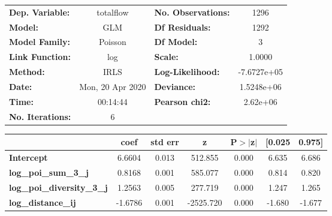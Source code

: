 \begin{center}
\begin{tabular}{lclc}
\toprule
\textbf{Dep. Variable:}            &    totalflow     & \textbf{  No. Observations:  } &      1296    \\
\textbf{Model:}                    &       GLM        & \textbf{  Df Residuals:      } &      1292    \\
\textbf{Model Family:}             &     Poisson      & \textbf{  Df Model:          } &         3    \\
\textbf{Link Function:}            &       log        & \textbf{  Scale:             } &     1.0000   \\
\textbf{Method:}                   &       IRLS       & \textbf{  Log-Likelihood:    } & -7.6727e+05  \\
\textbf{Date:}                     & Mon, 20 Apr 2020 & \textbf{  Deviance:          } &  1.5248e+06  \\
\textbf{Time:}                     &     00:14:44     & \textbf{  Pearson chi2:      } &   2.62e+06   \\
\textbf{No. Iterations:}           &        6         & \textbf{                     } &              \\
\bottomrule
\end{tabular}
\begin{tabular}{lcccccc}
                                   & \textbf{coef} & \textbf{std err} & \textbf{z} & \textbf{P$> |$z$|$} & \textbf{[0.025} & \textbf{0.975]}  \\
\midrule
\textbf{Intercept}                 &       6.6604  &        0.013     &   512.855  &         0.000        &        6.635    &        6.686     \\
\textbf{log\_poi\_sum\_3\_j}       &       0.8168  &        0.001     &   585.077  &         0.000        &        0.814    &        0.820     \\
\textbf{log\_poi\_diversity\_3\_j} &       1.2563  &        0.005     &   277.719  &         0.000        &        1.247    &        1.265     \\
\textbf{log\_distance\_ij}         &      -1.6786  &        0.001     & -2525.720  &         0.000        &       -1.680    &       -1.677     \\
\bottomrule
\end{tabular}
\end{center}